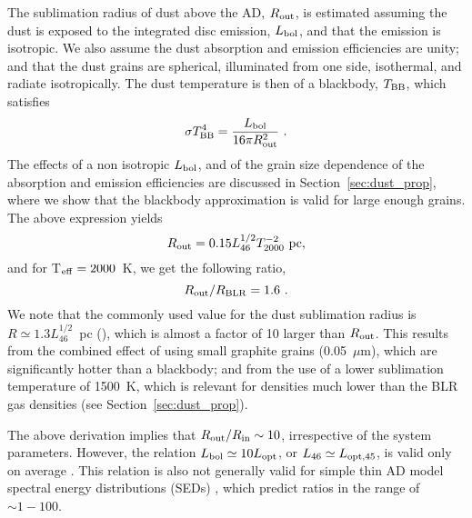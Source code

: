 \documentclass[a4paper,fleqn,usenatbib]{mnras}
\begin{document}
The sublimation radius of dust above the AD, $R_{\rm out}$, is estimated assuming the dust is exposed to the integrated disc emission, $L_{\rm bol}$, and that the emission is isotropic.
We also assume the dust absorption and emission efficiencies are unity; and that the dust grains are spherical, illuminated from one side, isothermal, and radiate isotropically. The dust temperature is then of a blackbody, $T_{\rm BB}$, which satisfies
\begin{equation}
\sigma T_{\rm BB}^4 = \frac{L_{\rm bol}}{16\pi R_{\rm out}^2}~. 
\label{eq:flux2}
\end{equation}
The effects of a non isotropic $L_{\rm bol}$, and of the grain size dependence of the absorption and 
emission efficiencies are discussed in Section~\ref{sec:dust_prop}, where we show that the blackbody approximation is valid for large enough grains. The above expression yields
\begin{equation}
R_{\rm out}=0.15 L_{46}^{1/2}T_{2000}^{-2}~{\rm pc} ,
\label{eq:Rout}
\end{equation}
and for T$_{\rm eff}=2000$~K, we get the following ratio, 
\begin{equation}
R_{\rm out}/R_{\rm BLR}= 1.6\ .
\end{equation}
We note that the commonly used value for the dust sublimation radius is 
$R\simeq 1.3 L_{46}^{1/2}$~pc (\citealt{Barvainis87}), which is almost a factor of 10 larger than $R_{\rm out}$. 
This results from the combined effect of using small graphite grains (0.05~$\mu$m), which are significantly hotter than a blackbody; and from the use of a lower sublimation temperature of 1500~K, which is relevant for densities much lower than the BLR gas
densities (see Section~\ref{sec:dust_prop}). 
 
The above derivation implies that $R_{\rm out}/R_{\rm in}\sim 10$, irrespective of the
system parameters. However, the relation $L_{\rm bol}\simeq 10L_{\rm opt}$, or
$L_{46}\simeq L_{\rm opt, 45}$, is valid only on average \citep{Richards06}. 
This relation is also not generally valid for simple thin AD model spectral energy distributions (SEDs)
\citep{DavisLaor11}, which predict ratios in the range of $\sim 1-100$.
\end{document}
